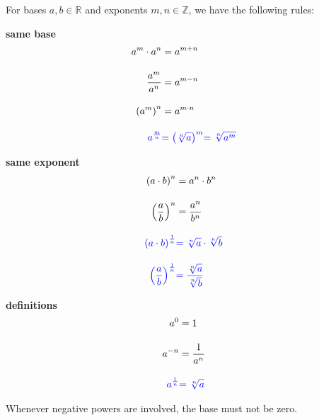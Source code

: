 \begin{tcolorbox}
	For bases $a,b\in\mathbb R$ and exponents $m,n\in\mathbb Z$, we have the following rules:
	\begin{multicols}{3}
		\centering
		\textbf{same base}\\
		\begin{align*}
			a^m\cdot a^n&=a^{m+n} \\[10pt]
			\frac{a^m}{a^n}&=a^{m-n} \\[10pt]
			\left(a^m\right)^n&=a^{m\cdot n} \\[10pt]
			\textcolor{blue}{a^{\frac{m}{n}}}&\textcolor{blue}{=\left(\sqrt[n]{a}\right)^m}
			\textcolor{blue}{=\sqrt[n]{a^m}}
		\end{align*}
		\vfill
		\columnbreak
		
		\textbf{same exponent}\\
		\begin{align*}
			\left(a\cdot b\right)^n&=a^n\cdot b^n \\[10pt]
			\left(\frac{a}{b}\right)^n&=\frac{a^n}{b^n} \\[10pt]
			\textcolor{blue}{\left(a\cdot b\right)^{\frac{1}{n}}}&\textcolor{blue}{=\sqrt[n]{a}\cdot\sqrt[n]{b}} \\[10pt]
			\textcolor{blue}{\left(\frac{a}{b}\right)^\frac{1}{n}}&
			\textcolor{blue}{=\frac{\sqrt[n]{a}}{\sqrt[n]{b}}}
		\end{align*}
		\vfill
		\columnbreak
		
		\textbf{definitions}\\
		\begin{align*}
			a^0&=1 \\[10pt]
			a^{-n}&=\frac{1}{a^n} \\[10pt]
			\textcolor{blue}{a^{\frac{1}{n}}}&\textcolor{blue}{=\sqrt[n]{a}}%
		\end{align*}
		\vfill
	\end{multicols}
	Whenever negative powers are involved, the base must not be zero.
\end{tcolorbox}
